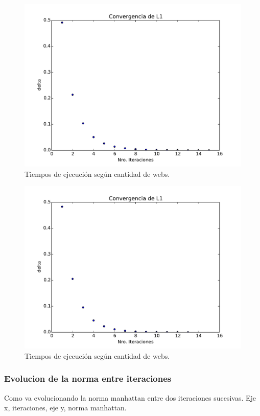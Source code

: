 \begin{figure}[h]
\centering
\includegraphics[scale=0.7]{images/2265.pdf}
\caption{Tiempos de ejecución según cantidad de webs.}
\label{timePageRank}
\end{figure}

\begin{figure}[h]
\centering
\includegraphics[scale=0.7]{images/5000.pdf}
\caption{Tiempos de ejecución según cantidad de webs.}
\label{timePageRank}
\end{figure}

\subsubsection{Evolucion de la norma entre iteraciones}
Como va evolucionando la norma manhattan entre dos iteraciones sucesivas. Eje x, iteraciones, eje y, norma manhattan.

